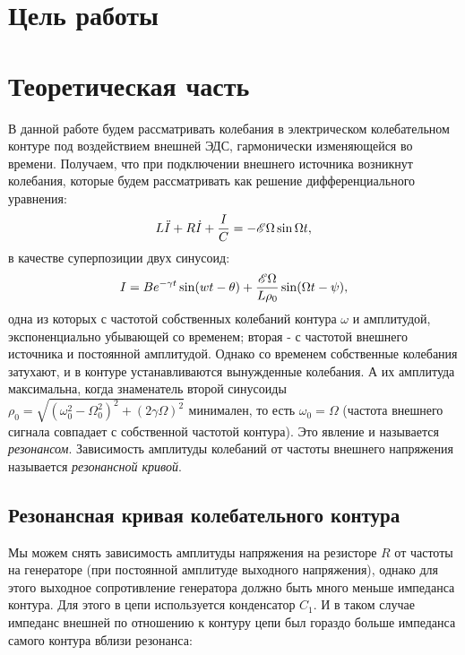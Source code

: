 \documentclass{letnab}
\begin{document}


\section{Цель работы}

\section{Теоретическая часть}

В данной работе будем рассматривать колебания в электрическом колебательном контуре под воздействием внешней ЭДС, гармонически изменяющейся во времени. 
Получаем, что при подключении внешнего источника возникнут колебания, которые будем рассматривать как решение дифференциального уравнения:
\begin{equation}
L\ddot{I} + R \dot{I} + \dfrac{I}{C} = - \mathscr{E} \Omega \sin \Omega t,
\end{equation}
в качестве суперпозиции двух синусоид: 
\begin{equation}
I = Be^{-\gamma t} \sin (wt-\theta) + \dfrac{\mathscr{E} \Omega}{L \rho_0} \sin (\Omega t - \psi),
\end{equation}
одна из которых с частотой собственных колебаний контура $\omega$ и амплитудой, экспоненциально убывающей со временем; вторая - с частотой внешнего источника и постоянной амплитудой. Однако со временем собственные колебания затухают, и в контуре устанавливаются вынужденные колебания. А их амплитуда максимальна, когда знаменатель второй синусоиды $\rho_0 = \sqrt{(\omega_0^2 - \Omega^2_0)^2 + (2\gamma \Omega)^2}$ минимален, то есть $\omega_0 = \Omega$ (частота внешнего сигнала совпадает с собственной частотой контура). Это явление и называется \textit{резонансом}. Зависимость амплитуды колебаний от частоты внешнего напряжения называется \textit{резонансной кривой}.

\subsection{Резонансная кривая колебательного контура}


Мы можем снять зависимость амплитуды напряжения на резисторе $R$ от частоты на генераторе (при постоянной амплитуде выходного напряжения), однако для этого выходное сопротивление генератора должно быть много меньше импеданса контура. Для этого в цепи используется конденсатор $C_1$. И в таком случае импеданс внешней по отношению к контуру цепи был гораздо больше импеданса самого контура вблизи резонанса:
\end{document}
